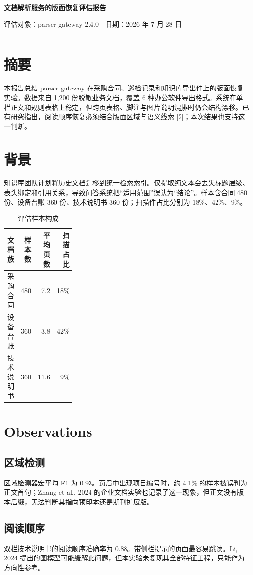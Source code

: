 \documentclass[11pt]{article}
\begin{document}
\begin{center}{\LARGE\bfseries 文档解析服务的版面恢复评估报告}\par\small 评估对象：parser-gateway 2.4.0　日期：2026 年 7 月 28 日\end{center}
\rule{\linewidth}{0.5pt}
\section*{摘要}
本报告总结 parser-gateway 在采购合同、巡检记录和知识库导出件上的版面恢复实验。数据来自 1,200 份脱敏业务文档，覆盖 6 种办公软件导出格式。系统在单栏正文和规则表格上稳定，但跨页表格、脚注与图片说明混排时仍会结构漂移。已有研究指出，阅读顺序恢复必须结合版面区域与语义线索 [2]；本次结果也支持这一判断。
\section*{背景}
知识库团队计划将历史文档迁移到统一检索索引。仅提取纯文本会丢失标题层级、表头绑定和引用关系，导致问答系统把“适用范围”误认为“结论”。样本含合同 480 份、设备台账 360 份、技术说明书 360 份；扫描件占比分别为 18\%、42\%、9\%。
\begin{table}[h]\centering\small\begin{tabular}{p{0.28\linewidth}rrr}\toprule 文档族&样本数&平均页数&扫描占比\\\midrule 采购合同&480&7.2&18\%\\设备台账&360&3.8&42\%\\技术说明书&360&11.6&9\%\\\bottomrule\end{tabular}\caption{评估样本构成}\end{table}
\section*{Observations}
\subsection*{区域检测}
区域检测器宏平均 F1 为 0.93。页眉中出现项目编号时，约 4.1\% 的样本被误判为正文首句；Zhang et al., 2024 的企业文档实验也记录了这一现象，但正文没有版本后缀，无法判断其指向预印本还是期刊扩展版。
\subsection*{阅读顺序}
双栏技术说明书的阅读顺序准确率为 0.88。带侧栏提示的页面最容易跳读。Li, 2024 提出的图模型可能缓解此问题，但本实验未复现其全部特征工程，只能作为方向性参考。
\end{document}
